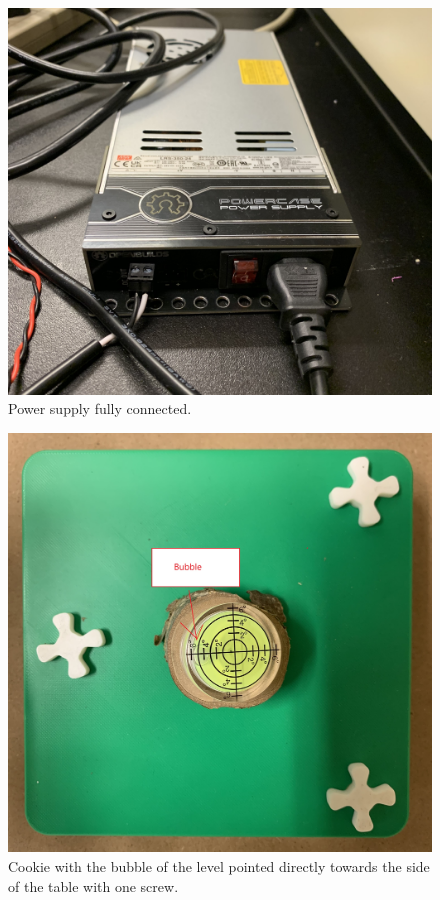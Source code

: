 \documentclass{article}
\begin{document}
\begin{outline}[enumerate]
    \begin{figure}
        \includegraphics[width=\linewidth]{../content/power_supply.jpg}
        \caption{Power supply fully connected.}
        \label{fig:power1}
    \end{figure}

    \begin{figure}
        \includegraphics[width=\linewidth]{../content/sample_before_level.jpg}
        \caption{Cookie with the bubble of the level pointed directly towards the side of the table with one screw.}
        \label{fig:level1}
    \end{figure}


\end{outline}
\end{document}
